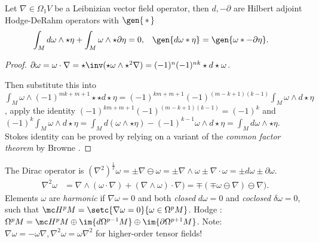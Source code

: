 \documentclass{juliacon}
\begin{document}
\begin{theorem}
	Let $ \nabla \in\Omega_1 V $ be a Leibnizian vector field operator, then $d,-\partial$ are Hilbert adjoint Hodge-DeRahm operators with $\gen{\,\ast\,}$
	\begin{align*}
		\int_M d\omega\wedge\star\eta +\int_M \omega\wedge\star\partial\eta &= 0, & \gen{d\omega\ast\eta} &=\gen{\omega\ast-\partial\eta}.
	\end{align*}
\end{theorem}
\begin{proof}
	$\partial\omega = \omega\cdot\nabla = \star\inv(\star\omega\wedge\star^2\nabla) = (-1)^n(-1)^{nk}\star d\star\omega$.


	Then  substitute this into $\int_M \omega\wedge(-1)^{mk+m+1}\star\star d\star\eta = (-1)^{km+m+1}(-1)^{(m-k+1)(k-1)}\int_M\omega\wedge d\star\eta$,
	apply the identity $(-1)^{km+m+1}(-1)^{(m-k+1)(k-1)}=(-1)^k$ and
	$ (-1)^k\int_M\omega\wedge d\star\eta = \int_M d(\omega\wedge\star\eta) - (-1)^{k-1}\omega\wedge d\star\eta = \int_M d\omega\wedge\star\eta$.
	Stokes identity can be proved by relying on a variant of the \textit{common factor theorem} by Browne \cite{browne}.
\end{proof}
\begin{theorem}
	The Dirac operator \cite{garling} is $ (\nabla^2)^\frac12\omega = \pm\nabla\ominus\omega = \pm\nabla\wedge\omega \pm \nabla\cdot\omega  = \pm d\omega\pm\partial\omega$.
	\begin{align*}
		\nabla^2\omega &= \nabla\wedge(\omega\cdot\nabla) + (\nabla\wedge\omega)\cdot\nabla) = \mp(\mp\omega\ominus\nabla)\ominus\nabla).
	\end{align*}
	Elements $\omega$ are \textit{harmonic} if $\nabla\omega = 0$ and both \textit{closed} $d\omega=0$ and \textit{coclosed} $\delta\omega=0$, such that $\mc H^p M = \setc{\nabla\omega = 0}{\omega\in \Omega^pM}$.
	Hodge \cite{ivancevic}:
	$\Omega^pM=\mc H^pM\oplus\im{d\Omega^{p-1}M}\oplus\im{\partial\Omega^{p+1}M}$.
	Note: $\nabla\omega=-\omega\nabla, \nabla^2\omega=\omega\nabla^2$ for higher-order tensor fields!
\end{theorem}

\end{document}
